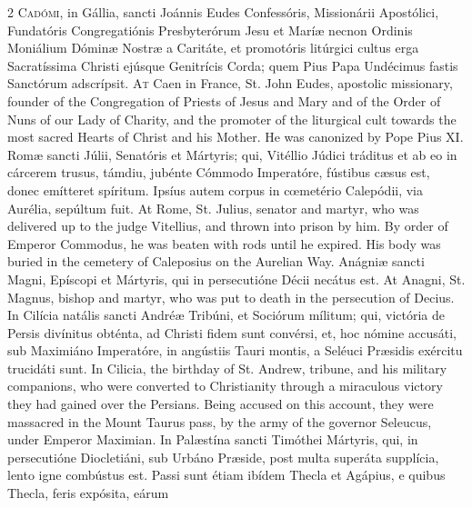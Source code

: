\begin{paracol}{2}
\lettrine[lines=2]{C}{adómi,} in Gállia, 
 sancti Joánnis Eudes Confessóris, Missionárii Apostólici, Fundatóris 
 Congregatiónis Presbyterórum Jesu et Maríæ necnon Ordinis Moniálium Dóminæ 
 Nostræ a Caritáte, et promotóris litúrgici cultus erga Sacratíssima Christi 
 ejúsque Genitrícis Corda; quem Pius Papa Undécimus fastis Sanctórum 
 adscrípsit.
\switchcolumn
{}
\lettrine[lines=2]{A}{t} Caen in France, St. John Eudes, 
 apostolic missionary, founder of the Congregation of Priests of Jesus and 
 Mary and of the Order of Nuns of our Lady of Charity, and the promoter of 
 the liturgical cult towards the most sacred Hearts of Christ and his Mother. 
 He was canonized by Pope Pius XI.
\switchcolumn*
{}
Romæ sancti Júlii, 
 Senatóris et Mártyris; qui, Vitéllio Júdici tráditus et ab eo in cárcerem 
 trusus, támdiu, jubénte Cómmodo Imperatóre, fústibus cæsus est, donec 
 emítteret spíritum. Ipsíus autem corpus in cœmetério Calepódii, via 
 Aurélia, sepúltum fuit.
\switchcolumn
{}
At Rome, St. Julius, senator and 
 martyr, who was delivered up to the judge Vitellius, and thrown into prison 
 by him. By order of Emperor Commodus, he was beaten with rods until he 
 expired. His body was buried in the cemetery of Caleposius on the 
 Aurelian Way.
\switchcolumn*
{}
Anágniæ sancti Magni, 
 Epíscopi et Mártyris, qui in persecutióne Décii necátus est.
\switchcolumn
{}
At Anagni, St. Magnus, bishop and 
 martyr, who was put to death in the persecution of Decius.
\switchcolumn*
{}
In Cilícia natális 
 sancti Andréæ Tribúni, et Sociórum mílitum; qui, victória de Persis 
 divínitus obténta, ad Christi fidem sunt convérsi, et, hoc nómine accusáti, 
 sub Maximiáno Imperatóre, in angústiis Tauri montis, a Seléuci Præsidis 
 exércitu trucidáti sunt.
\switchcolumn
{}
In Cilicia, the birthday of St. 
 Andrew, tribune, and his military companions, who were converted to 
 Christianity through a miraculous victory they had gained over the Persians. 
 Being accused on this account, they were massacred in the Mount Taurus pass, 
 by the army of the governor Seleucus, under Emperor Maximian.
\switchcolumn*
{}
In Palæstína sancti 
 Timóthei Mártyris, qui, in persecutióne Diocletiáni, sub Urbáno Præside, 
 post multa superáta supplícia, lento igne combústus est. Passi sunt 
 étiam ibídem Thecla et Agápius, e quibus Thecla, feris expósita, eárum 

\end{paracol}
